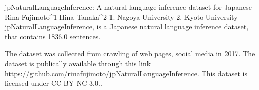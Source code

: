 
jpNaturalLanguageInference: A natural language inference dataset for Japanese
Rina Fujimoto^1 Hina Tanaka^2
1. Nagoya University 2. Kyoto University
jpNaturalLanguageInference, is a Japanese natural language inference dataset, that contains 1836.0 sentences.

The dataset was collected from crawling of web pages, social media in 2017. 
The dataset is publically available through this link https://github.com/rinafujimoto/jpNaturalLanguageInference. This dataset is licensed under CC BY-NC 3.0..

